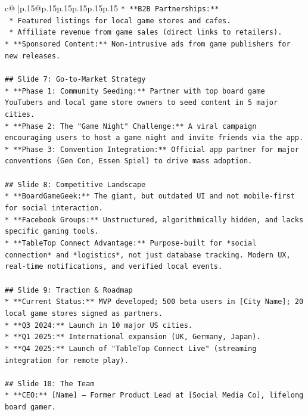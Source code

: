 \documentclass{article}
\begin{document}
{\begin{supertabular}{c@{$\;$}|p{.15\linewidth}@{}p{.15\linewidth}p{.15\linewidth}p{.15\linewidth}p{.15\linewidth}p{.15\linewidth}}
{{{\texttt{*   **B2B Partnerships:**} \\
\texttt{    *   Featured listings for local game stores and cafes.} \\
\texttt{    *   Affiliate revenue from game sales (direct links to retailers).} \\
\texttt{*   **Sponsored Content:** Non{-}intrusive ads from game publishers for new releases.} \\
\\ 
\texttt{\#\# Slide 7: Go{-}to{-}Market Strategy} \\
\texttt{*   **Phase 1: Community Seeding:** Partner with top board game YouTubers and local game store owners to seed content in 5 major cities.} \\
\texttt{*   **Phase 2: The "Game Night" Challenge:** A viral campaign encouraging users to host a game night and invite friends via the app.} \\
\texttt{*   **Phase 3: Convention Integration:** Official app partner for major conventions (Gen Con, Essen Spiel) to drive mass adoption.} \\
\\ 
\texttt{\#\# Slide 8: Competitive Landscape} \\
\texttt{*   **BoardGameGeek:** The giant, but outdated UI and not mobile{-}first for social interaction.} \\
\texttt{*   **Facebook Groups:** Unstructured, algorithmically hidden, and lacks specific gaming tools.} \\
\texttt{*   **TableTop Connect Advantage:** Purpose{-}built for *social connection* and *logistics*, not just database tracking. Modern UX, real{-}time notifications, and verified local events.} \\
\\ 
\texttt{\#\# Slide 9: Traction \& Roadmap} \\
\texttt{*   **Current Status:** MVP developed; 500 beta users in {[}City Name{]}; 20 local game stores signed as partners.} \\
\texttt{*   **Q3 2024:** Launch in 10 major US cities.} \\
\texttt{*   **Q1 2025:** International expansion (UK, Germany, Japan).} \\
\texttt{*   **Q4 2025:** Launch of "TableTop Connect Live" (streaming integration for remote play).} \\
\\ 
\texttt{\#\# Slide 10: The Team} \\
\texttt{*   **CEO:** {[}Name{]} – Former Product Lead at {[}Social Media Co{]}, lifelong board gamer.} \\
}}}
\end{supertabular}}
\end{document}
